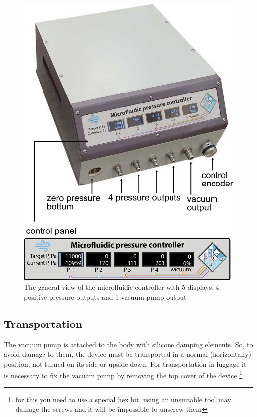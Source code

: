 \documentclass[twoside, 12pt, a4paper]{refart}
\begin{document}
    \begin{figure}[h!b]
	  \begin{center}
	  \includegraphics[width=\textwidth]{imgs/device.png}
	  \caption{The general view of the microfluidic controller with 5 displays, 4 positive pressure outputs and 1 vacuum pump output}
	  \label{fig:device}
	  \end{center}
    \end{figure}


  \subsection{Transportation}
    The vacuum pump is attached to the body with silicone damping elements. So, to avoid damage to them, the device must be transported in a normal (horizontally) position, not turned on its side or upside down. For transportation in luggage it is necessary to fix the vacuum pump by removing the top cover of the device \footnote {for this you need to use a special hex bit, using an unsuitable tool may damage the screws and it will be impossible to unscrew them}
    
\end{document}
